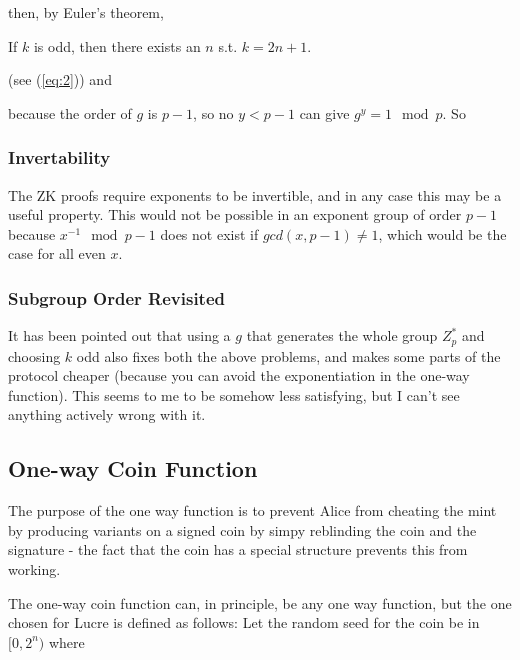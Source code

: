 \documentclass[a4paper,titlepage]{article}
\begin{document}

then, by Euler's theorem, 


If $k$ is odd, then there exists an $n$ s.t. $k=2n+1$.



(see (\ref{eq:2})) and


because the order of $g$ is $p-1$, so no $y < p-1$ can give $g^y=1
 \mod p$. So


\subsubsection{Invertability}

The ZK proofs require exponents to be invertible, and in any case this
may be a useful property. This would not be possible in an exponent
group of order $p-1$ because $x^{-1}
\mod{p-1}$ does not exist if $gcd(x,p-1) \neq 1$, which would be the
case for all even $x$.

\subsubsection{Subgroup Order Revisited}

It has been pointed out that using a $g$ that generates the whole
group $Z_p^*$ and choosing $k$ odd also fixes both the above problems,
and makes some parts of the protocol cheaper (because you can avoid
the exponentiation in the one-way function). This seems to me to be
somehow less satisfying, but I can't see anything actively wrong with
it.

\subsection{One-way Coin Function}
\label{sec:oneway}

The purpose of the one way function is to prevent Alice from cheating
the mint by producing variants on a signed coin by simpy reblinding
the coin and the signature - the fact that the coin has a special
structure prevents this from working.

The one-way coin function can, in principle, be any one way function,
but the one chosen for Lucre is defined as follows: Let the random
seed for the coin be in $[0,2^n)$ where 
\end{document}
